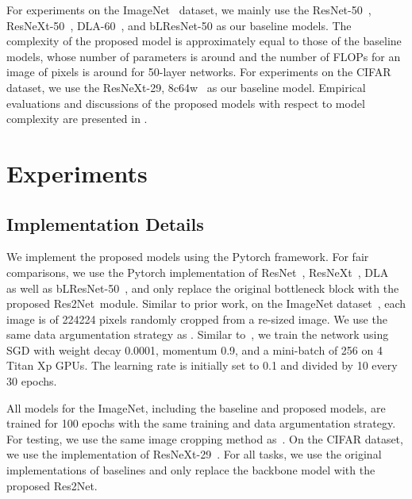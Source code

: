 \documentclass[10pt,journal,cspaper,compsoc]{IEEEtran}
\newcommand{\ourM}{{Res2Net}}
\begin{document}
For experiments on the ImageNet~\cite{russakovsky2015imagenet} dataset,
we mainly use the ResNet-50~\cite{he2016deep}, ResNeXt-50~\cite{xie2017aggregated},
DLA-60~\cite{yu2018deep}, and bLResNet-50 \cite{chen2018biglittle}
as our baseline models.
The complexity of the proposed model is approximately equal to 
those of the baseline models,
whose number of parameters is around  and the number of FLOPs
for an image of  pixels is around 
for 50-layer networks.
For experiments on the CIFAR~\cite{krizhevsky2009learning} dataset,
we use the ResNeXt-29, 8c64w~\cite{xie2017aggregated} 
as our baseline model.
Empirical evaluations and discussions of the proposed models with respect to
model complexity are presented in .



\section{Experiments}\label{sec:experiments}


\subsection{Implementation Details}
We implement the proposed models using the Pytorch framework.
For fair comparisons, we use the Pytorch implementation of ResNet~\cite{he2016deep},
ResNeXt~\cite{xie2017aggregated}, DLA~\cite{yu2018deep} as well as 
bLResNet-50~\cite{chen2018biglittle},
and only replace the original bottleneck block with the proposed \ourM~module.
Similar to prior work, on the ImageNet dataset~\cite{russakovsky2015imagenet},
each image is of 224224 pixels randomly cropped from
a re-sized image.
We use the same data argumentation strategy as \cite{he2016deep,szegedy2016rethinking}.
Similar to~\cite{he2016deep},
we train the network using SGD with weight decay 0.0001, momentum 0.9,
and a mini-batch of 256 on 4 Titan Xp GPUs.
The learning rate is initially set to 0.1 and divided by 10 every 30 epochs.


All models for the ImageNet, including the baseline and  proposed models,
are trained for 100 epochs with the same training and data argumentation strategy.
For testing, we use the same image cropping method as~\cite{he2016deep}.
On the CIFAR dataset, we use the implementation of
ResNeXt-29~\cite{xie2017aggregated}.
For all tasks, we use the original implementations of baselines and
only replace the backbone model with the proposed \ourM.


\newcommand{\ResNet}{{ResNet-50~\cite{he2016deep}}}
\newcommand{\ResNeXt}{{ResNeXt-50~\cite{xie2017aggregated}}}
\newcommand{\DLA}{{DLA-60~\cite{yu2018deep}}}
\newcommand{\DLAX}{{DLA-X-60~\cite{yu2018deep}}}
\newcommand{\ResNetSE}{{SENet-50~\cite{hu2018senet}}}
\newcommand{\ResNeXtSE}{{SENeXt-50~\cite{hu2018senet}}}
\newcommand{\InceptionV}{{InceptionV3~\cite{szegedy2016rethinking}}}
\newcommand{\BLResNet}{{bLResNet-50~\cite{chen2018biglittle}}}
\end{document}
